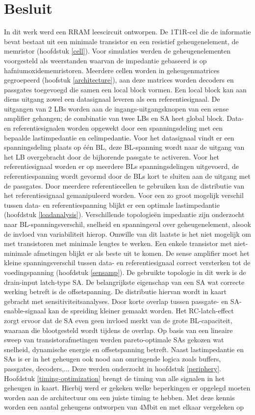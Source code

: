 \chapter{Besluit}
\label{besluit}
In dit werk werd een RRAM leescircuit ontworpen. De 1T1R-cel die de informatie bevat bestaat uit een minimale transistor en een resistief geheugenelement, de memristor (hoofdstuk \ref{cell}). Voor simulaties werden de geheugenelementen voorgesteld als weerstanden waarvan de impedantie gebaseerd is op hafniumoxidememristoren. Meerdere cellen worden in geheugenmatrices gegroepeerd (hoofstuk \ref{architecture}), aan deze matrices worden decoders en passgates toegevoegd die samen een local block vormen. Een local block kan aan diens uitgang zowel een datasignaal leveren als een referentiesignaal. De uitgangen van 2 LBs worden aan de ingangs-uitgangsknopen van een sense amplifier gehangen; de combinatie van twee LBs en SA heet global block. Data- en referentiesignalen worden opgewekt door een spanningsdeling met een bepaalde lastimpedantie en celimpedantie. Voor het datasignaal vindt er een spanningsdeling plaats op één BL, deze BL-spanning wordt naar de uitgang van het LB overgebracht door de bijhorende passgate te activeren. Voor het referentiesignaal worden er op meerdere BLs spanningsdelingen uitgevoerd, de referentiespanning wordt gevormd door de BLs kort te sluiten aan de uitgang met de passgates. Door meerdere referentiecellen te gebruiken kan de distributie van het referentiesignaal gemanipuleerd worden. Voor een zo groot mogelijk verschil tussen data- en referentiespanning blijkt er een optimale lastimpedantie (hoofdstuk \ref{loadanalysis}). Verschillende topologieën impedantie zijn onderzocht naar BL-spanningsverschil, snelheid en spanningsval over geheugenelement, alsook de invloed van variabiliteit hierop. Omwille van dit laatste is het niet mogelijk om met transistoren met minimale lengtes te werken. Een enkele transistor met niet-minimale afmetingen blijkt er als beste uit te komen. De sense amplifier moet het kleine spanningsverschil tussen data- en referentiesignaal correct versterken tot de voedingspanning (hoofdstuk \ref{sensamp}). De gebruikte topologie in dit werk is de drain-input latch-type SA. De belangrijkste eigenschap van een SA wat correcte werking betreft is de offsetspanning. De distributie hiervan wordt in kaart gebracht met sensitiviteitsanalyses. Door korte overlap tussen passgate- en SA-enable-signaal kan de spreiding kleiner gemaakt worden. Het RC-latch-effect zorgt ervoor dat de SA even geen invloed merkt van de grote BL-capaciteit, waaraan die blootgesteld wordt tijdens de overlap. Op basis van een lineaire sweep van transistorafmetingen werden  pareto-optimale SAs gekozen wat snelheid, dynamische energie en offsetspanning betreft. Naast lastimpedantie en SAs is er in het geheugen ook nood aan omringende logica zoals buffers, passgates, decoders,... Deze werden onderzocht in hoofdstuk \ref{periphery}. Hoofdstuk \ref{timing-optimization} brengt de timing van alle signalen in het geheugen in kaart. Hierbij werd er gekeken welke beperkingen er opgelegd moeten worden aan de architectuur om een juiste timing te hebben. Met deze kennis worden een aantal geheugens ontworpen van 4Mbit en met elkaar vergeleken op 